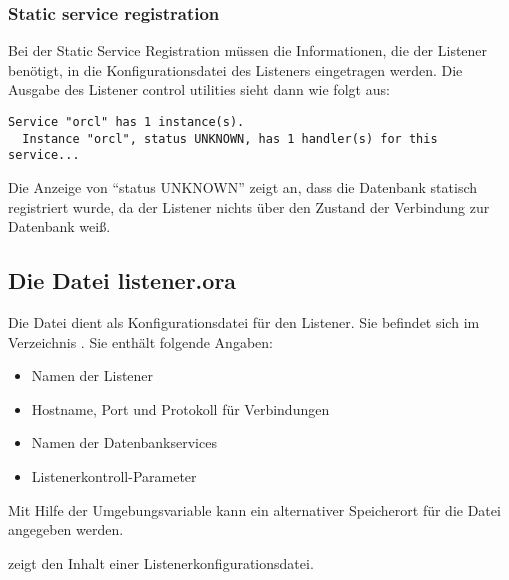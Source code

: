         \subsubsection{Static service registration}
          Bei der Static Service Registration m\"ussen die Informationen, die der Listener ben\"otigt, in die Konfigurationsdatei des Listeners eingetragen werden. Die Ausgabe des Listener control utilities sieht dann wie folgt aus:
          \begin{lstlisting}[caption={Statische Registrierung},label=admin601,language=terminal]
Service "orcl" has 1 instance(s).
  Instance "orcl", status UNKNOWN, has 1 handler(s) for this service...
          \end{lstlisting}
          Die Anzeige von \enquote{status UNKNOWN} zeigt an, dass die Datenbank statisch registriert wurde, da der Listener nichts \"uber den Zustand der Verbindung zur Datenbank wei\ss{}.
      \subsection{Die Datei listener.ora}
        Die Datei  dient als Konfigurationsdatei f\"ur den Listener. Sie befindet sich im Verzeichnis . Sie enth\"alt folgende Angaben:
        \begin{itemize}
          \item Namen der Listener
          \item Hostname, Port und Protokoll f\"ur Verbindungen
          \item Namen der Datenbankservices
          \item Listenerkontroll-Parameter
        \end{itemize}
        \begin{merke}
          Mit Hilfe der Umgebungsvariable  kann ein alternativer Speicherort f\"ur die Datei  angegeben werden.
        \end{merke}
         zeigt den Inhalt einer Listenerkonfigurationsdatei.

